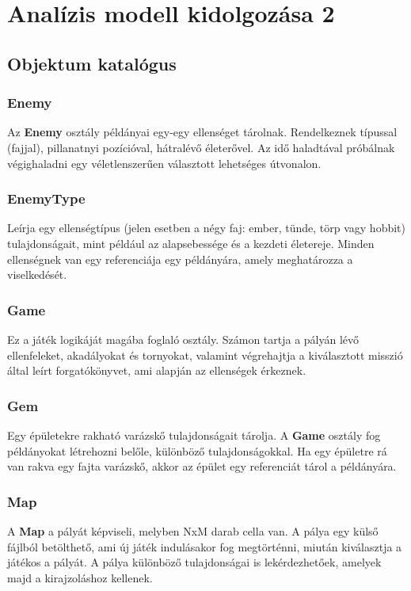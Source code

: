 %
\chapter{Analízis modell kidolgozása 2}

\thispagestyle{fancy}

\section{Objektum katalógus}

\subsection{Enemy}
Az \textbf{Enemy} osztály példányai egy-egy ellenséget tárolnak. Rendelkeznek típussal (fajjal), pillanatnyi pozícióval, hátralévő életerővel. Az idő haladtával próbálnak végighaladni egy véletlenszerűen választott lehetséges útvonalon.

\subsection{EnemyType}
Leírja egy ellenségtípus (jelen esetben a négy faj: ember, tünde, törp vagy hobbit) tulajdonságait, mint például az alapsebessége és a kezdeti életereje. Minden ellenségnek van egy referenciája egy példányára, amely meghatározza a viselkedését.

\subsection{Game}
Ez a játék logikáját magába foglaló osztály. Számon tartja a pályán lévő ellenfeleket, akadályokat és tornyokat, valamint végrehajtja a kiválasztott misszió által leírt forgatókönyvet, ami alapján az ellenségek érkeznek.

\subsection{Gem}
Egy épületekre rakható varázskő tulajdonságait tárolja. A \textbf{Game} osztály fog példányokat létrehozni belőle, különböző tulajdonságokkal. Ha egy épületre rá van rakva egy fajta varázskő, akkor az épület egy referenciát tárol a példányára.

\subsection{Map}
A \textbf{Map} a pályát képviseli, melyben NxM darab cella van. A pálya egy külső fájlból betölthető, ami új játék indulásakor fog megtörténni, miután kiválasztja a játékos a pályát. A pálya különböző tulajdonságai is lekérdezhetőek, amelyek majd a kirajzoláshoz kellenek.

